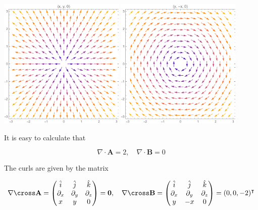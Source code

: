 \documentclass[12pt]{article}
\begin{document}
\begin{center}
    \includegraphics[width=0.45\textwidth]{../plots/VC_4_3_a.png}
    \includegraphics[width=0.45\textwidth]{../plots/VC_4_3_b.png}
\end{center}

It is easy to calculate that

\begin{equation}
    \nabla \cdot \mathbf{A} = 2, \quad \nabla \cdot \mathbf{B} = 0
\end{equation}

The curls are given by the matrix

\begin{equation}
    \nabla \cross \mathbf{A} = 
    \begin{pmatrix}
        \hat{i} & \hat{j} & \hat{k} \\
        \partial_{x} & \partial_{y} & \partial_{z} \\
        x & y & 0
    \end{pmatrix}
    =
    \mathbf{0}, \quad
    \nabla \cross \mathbf{B} =
    \begin{pmatrix}
        \hat{i} & \hat{j} & \hat{k} \\
        \partial_{x} & \partial_{y} & \partial_{z} \\
        y & -x & 0
    \end{pmatrix}
    =
    (0, 0, -2)^{\intercal}
\end{equation}
\end{document}

